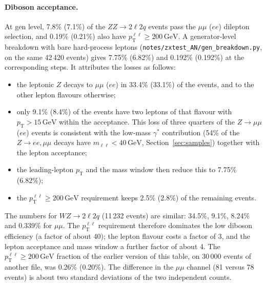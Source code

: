 \documentclass[11pt]{article}
\newcommand{\pt}{p_{\mathrm{T}}}
\newcommand{\GeV}{\ensuremath{\,\mathrm{GeV}}}
\newcommand{\ptll}{\pt^{\ell\ell}}
\newcommand{\code}[1]{\texttt{#1}}
\begin{document}
\paragraph{Diboson acceptance.} At gen level, 7.8\% (7.1\%) of the $ZZ\to2\ell2q$ events pass the $\mu\mu$ ($ee$)
dilepton selection, and 0.19\% (0.21\%) also have $\ptll \geq 200\GeV$. A generator-level breakdown with bare
hard-process leptons (\code{notes/zxtest\_AN/gen\_breakdown.py}, on the same 42\,420 events) gives 7.75\% (6.82\%) and
0.192\% (0.192\%) at the corresponding steps. It attributes the losses as follows:
\begin{itemize}
\item the leptonic $Z$ decays to $\mu\mu$ ($ee$) in 33.4\% (33.1\%) of the events, and to the other lepton flavours
  otherwise;
\item only 9.1\% (8.4\%) of the events have two leptons of that flavour with $\pt > 15\GeV$ within the acceptance. This
  loss of three quarters of the $Z\to\mu\mu$ ($ee$) events is consistent with the low-mass $\gamma^*$ contribution
  (54\% of the $Z\to ee,\mu\mu$ decays have $m_{\ell\ell} < 40\GeV$, Section~\ref{sec:samples}) together with the
  lepton acceptance;
\item the leading-lepton $\pt$ and the mass window then reduce this to 7.75\% (6.82\%);
\item the $\ptll \geq 200\GeV$ requirement keeps 2.5\% (2.8\%) of the remaining events.
\end{itemize}
The numbers for $WZ\to2\ell2q$ (11\,232 events) are similar: 34.5\%, 9.1\%, 8.24\% and 0.339\% for $\mu\mu$. The
$\ptll$ requirement therefore dominates the low diboson efficiency (a factor of about 40); the lepton flavour costs a
factor of 3, and the lepton acceptance and mass window a further factor of about 4. The $\ptll \geq 200\GeV$ fraction
of the earlier version of this table, on 30\,000 events of another file, was 0.26\% (0.20\%). The difference in the
$\mu\mu$ channel (81 versus 78 events) is about two standard deviations of the two independent counts.
\end{document}
